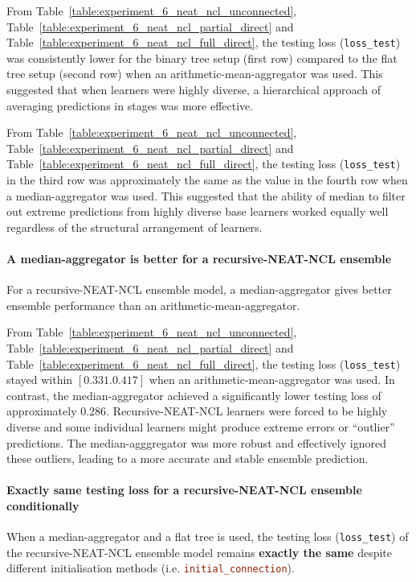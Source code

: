 From Table~\ref{table:experiment_6_neat_ncl_unconnected}, Table~\ref{table:experiment_6_neat_ncl_partial_direct} and Table~\ref{table:experiment_6_neat_ncl_full_direct}, the testing loss (\texttt{loss\_test}) was consistently lower for the binary tree setup (first row) compared to the flat tree setup (second row) when an arithmetic-mean-aggregator was used. This suggested that when learners were highly diverse, a hierarchical approach of averaging predictions in stages was more effective. 

From Table~\ref{table:experiment_6_neat_ncl_unconnected}, Table~\ref{table:experiment_6_neat_ncl_partial_direct} and Table~\ref{table:experiment_6_neat_ncl_full_direct}, the testing loss (\texttt{loss\_test}) in the third row was approximately the same as the value in the fourth row when a median-aggregator was used. This suggested that the ability of median to filter out extreme predictions from highly diverse base learners worked equally well regardless of the structural arrangement of learners. 

\paragraph{A median-aggregator is better for a recursive-NEAT-NCL ensemble}
For a recursive-NEAT-NCL ensemble model, a median-aggregator gives better ensemble performance than an arithmetic-mean-aggregator. 

From Table~\ref{table:experiment_6_neat_ncl_unconnected}, Table~\ref{table:experiment_6_neat_ncl_partial_direct} and Table~\ref{table:experiment_6_neat_ncl_full_direct}, the testing loss (\texttt{loss\_test}) stayed within $[0.331. 0.417]$ when an arithmetic-mean-aggregator was used. In contrast, the median-aggregator achieved a significantly lower testing loss of approximately $0.286$. Recursive-NEAT-NCL learners were forced to be highly diverse and some individual learners might produce extreme errors or ``outlier'' predictions. The median-agggregator was more robust and effectively ignored these outliers, leading to a more accurate and stable ensemble prediction. 

\paragraph{Exactly same testing loss for a recursive-NEAT-NCL ensemble conditionally}
When a median-aggregator and a flat tree is used, the testing loss (\texttt{loss\_test}) of the recursive-NEAT-NCL ensemble model remains \textbf{exactly the same} despite different initialisation methods (i.e. \lstinline[language=ini]|initial_connection|). 

